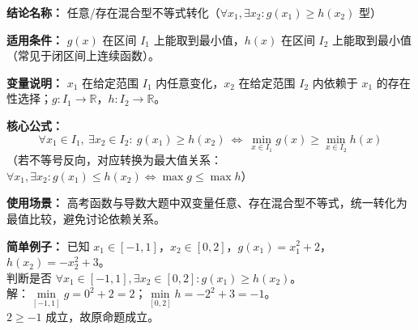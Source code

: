 \textbf{结论名称：} 任意/存在混合型不等式转化（\(\forall x_1,\exists x_2: g(x_1)\ge h(x_2)\) 型）

\textbf{适用条件：} \(g(x)\) 在区间 \(I_1\) 上能取到最小值，\(h(x)\) 在区间 \(I_2\) 上能取到最小值（常见于闭区间上连续函数）。

\textbf{变量说明：} \(x_1\) 在给定范围 \(I_1\) 内任意变化，\(x_2\) 在给定范围 \(I_2\) 内依赖于 \(x_1\) 的存在性选择；\(g:I_1\to\mathbb{R}\)，\(h:I_2\to\mathbb{R}\)。

\textbf{核心公式：}
\[
\boxed{\forall x_1\in I_1,\ \exists x_2\in I_2:\ g(x_1)\ge h(x_2)\ \Longleftrightarrow\ \min_{x\in I_1}g(x)\ge \min_{x\in I_2}h(x)}
\]
（若不等号反向，对应转换为最大值关系：\(\forall x_1,\exists x_2: g(x_1)\le h(x_2)\iff \max g\le\max h\)）

\textbf{使用场景：} 高考函数与导数大题中双变量任意、存在混合型不等式，统一转化为最值比较，避免讨论依赖关系。

\textbf{简单例子：} 已知 \(x_1\in[-1,1]\)，\(x_2\in[0,2]\)，\(g(x_1)=x_1^2+2\)，\(h(x_2)=-x_2^2+3\)。\\
判断是否 \(\forall x_1\in[-1,1],\exists x_2\in[0,2]: g(x_1)\ge h(x_2)\)。\\
解：\(\min\limits_{[-1,1]}g=0^2+2=2\)；\(\min\limits_{[0,2]}h=-2^2+3=-1\)。\\
\(2\ge -1\) 成立，故原命题成立。